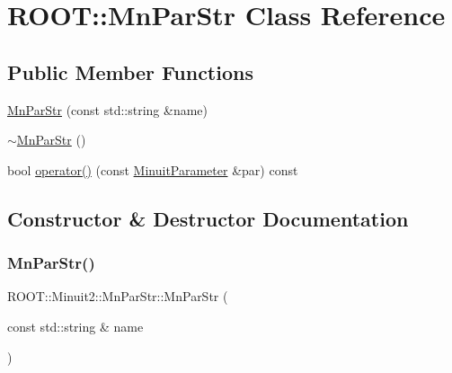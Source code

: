 \hypertarget{classROOT_1_1Minuit2_1_1MnParStr}{}\section{R\+O\+OT\+:\+:Mn\+Par\+Str Class Reference}
\label{classROOT_1_1Minuit2_1_1MnParStr}
\subsection*{Public Member Functions}
\begin{DoxyCompactItemize}
\item 
\mbox{\hyperlink{classROOT_1_1Minuit2_1_1MnParStr_a2ef440b65a2b0fd06a40f11354984488}{Mn\+Par\+Str}} (const std\+::string \&name)
\item 
\mbox{\hyperlink{classROOT_1_1Minuit2_1_1MnParStr_ae846c5b1bcce986267a463929719e64c}{$\sim$\+Mn\+Par\+Str}} ()
\item 
bool \mbox{\hyperlink{classROOT_1_1Minuit2_1_1MnParStr_a34637805bbe12052e26f2eab37d23ff1}{operator()}} (const \mbox{\hyperlink{classROOT_1_1Minuit2_1_1MinuitParameter}{Minuit\+Parameter}} \&par) const
\end{DoxyCompactItemize}


\subsection{Constructor \& Destructor Documentation}
\mbox{\label{classROOT_1_1Minuit2_1_1MnParStr_a2ef440b65a2b0fd06a40f11354984488}} 
\subsubsection{\texorpdfstring{MnParStr()}{MnParStr()}}
{\footnotesize\ttfamily R\+O\+O\+T\+::\+Minuit2\+::\+Mn\+Par\+Str\+::\+Mn\+Par\+Str (\begin{DoxyParamCaption}\item[{const std\+::string \&}]{name }\end{DoxyParamCaption})\hspace{0.3cm}{\ttfamily [inline]}}

\mbox{\label{classROOT_1_1Minuit2_1_1MnParStr_ae846c5b1bcce986267a463929719e64c}} 
